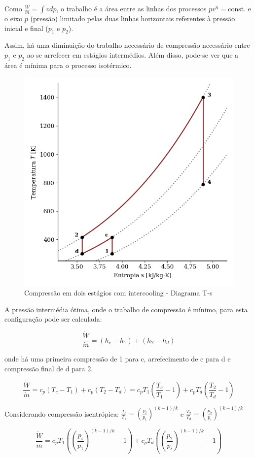 Como $\frac{\dot{W}}{\dot{m}} = \int v dp$, o trabalho é a área entre as linhas dos processos $pv^n = \text{const.}$ e o eixo $p$ (pressão) limitado pelas duas linhas horizontais referentes à pressão inicial e final ($p_1$ e $p_2$).

Assim, há uma diminuição do trabalho necessário de compressão necessário entre $p_1$ e $p_2$ ao se arrefecer em estágios intermédios. Além disso, pode-se ver que a área é mínima para o processo isotérmico.


\begin{figure}[H]
    \centering
    \includegraphics[width=0.45\linewidth]{graphs/brayton-Ts-ideal-intercooling.png}
    \caption{Compressão em dois estágios com intercooling - Diagrama T-s}
    \label{fig:brayton-Ts-ideal-intercooling}
\end{figure}

A pressão intermédia ótima, onde o trabalho de compressão é mínimo, para esta configuração pode ser calculada:

\begin{equation*}
    \frac{\dot{W}}{\dot{m}} = (h_c - h_1) + (h_2 - h_d)
\end{equation*}

onde há uma primeira compressão de 1 para c, arrefecimento de c para d e compressão final de d para 2.

\begin{equation*}
    \frac{\dot{W}}{\dot{m}} = c_p(T_c - T_1) + c_p(T_2 - T_d) = c_p T_1\left(\frac{T_c}{T_1} - 1\right) + c_p T_d \left(\frac{T_2}{T_d} - 1 \right)
\end{equation*}

Considerando compressão isentrópica: $\frac{T_c}{T_1} = \left( \frac{p_i}{p_1} \right)^{(k-1)/k}$ e $\frac{T_2}{T_d} = \left( \frac{p_2}{p_i} \right)^{(k-1)/k}$

\begin{equation*}
    \frac{\dot{W}}{\dot{m}} = c_p T_1\left(\left( \frac{p_i}{p_1} \right)^{(k-1)/k} - 1\right) + c_p T_d \left(\left( \frac{p_2}{p_i} \right)^{(k-1)/k} - 1 \right)
\end{equation*}

